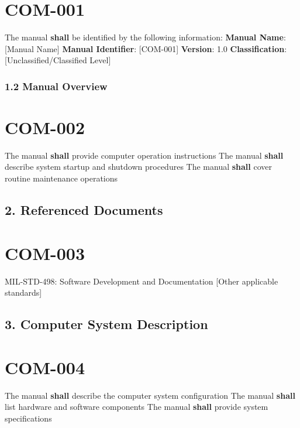 \section{COM-001}\label{COM-001}

The manual \textbf{shall} be identified by the following information:
\textbf{Manual Name}: [Manual Name]
\textbf{Manual Identifier}: [COM-001]
\textbf{Version}: 1.0
\textbf{Classification}: [Unclassified/Classified Level]

\subsubsection{1.2 Manual Overview}

\section{COM-002}\label{COM-002}

The manual \textbf{shall} provide computer operation instructions
The manual \textbf{shall} describe system startup and shutdown procedures
The manual \textbf{shall} cover routine maintenance operations

\subsection{2. Referenced Documents}

\section{COM-003}\label{COM-003}

MIL-STD-498: Software Development and Documentation
[Other applicable standards]\\

\subsection{3. Computer System Description}

\section{COM-004}\label{COM-004}

The manual \textbf{shall} describe the computer system configuration
The manual \textbf{shall} list hardware and software components
The manual \textbf{shall} provide system specifications

